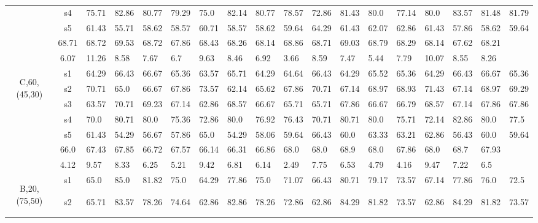 \begin{table}[h]
{\begin{tabular}{cc|llll|llll|llll|llll}
 & s4 & 75.71 & 82.86 & 80.77 & 79.29 & 75.0 & 82.14 & 80.77 & 78.57 & 72.86 & 81.43 & 80.0 & 77.14 & 80.0 & 83.57 & 81.48 & 81.79 \\
 & s5 & 61.43 & 55.71 & 58.62 & 58.57 & 60.71 & 58.57 & 58.62 & 59.64 & 64.29 & 61.43 & 62.07 & 62.86 & 61.43 & 57.86 & 58.62 & 59.64 \\
\rowcolor{lightgray!50}\multicolumn{2}{r|}{avg} & 68.71 & 68.72 & 69.53 & 68.72 & 67.86 & 68.43 & 68.26 & 68.14 & 68.86 & 68.71 & 69.03 & 68.79 & 68.29 & 68.14 & 67.62 & 68.21 \\
\rowcolor{lightgray!50}\multicolumn{2}{r|}{std} & 6.07 & 11.26 & 8.58 & 7.67 & 6.7 & 9.63 & 8.46 & 6.92 & 3.66 & 8.59 & 7.47 & 5.44 & 7.79 & 10.07 & 8.55 & 8.26 \\
\multirow{6}{*}{\begin{sideways}C,60,(45,30)\end{sideways}} & s1 & 64.29 & 66.43 & 66.67 & 65.36 & 63.57 & 65.71 & 64.29 & 64.64 & 66.43 & 64.29 & 65.52 & 65.36 & 64.29 & 66.43 & 66.67 & 65.36 \\
 & s2 & 70.71 & 65.0 & 66.67 & 67.86 & 73.57 & 62.14 & 65.62 & 67.86 & 70.71 & 67.14 & 68.97 & 68.93 & 71.43 & 67.14 & 68.97 & 69.29 \\
 & s3 & 63.57 & 70.71 & 69.23 & 67.14 & 62.86 & 68.57 & 66.67 & 65.71 & 65.71 & 67.86 & 66.67 & 66.79 & 68.57 & 67.14 & 67.86 & 67.86 \\
 & s4 & 70.0 & 80.71 & 80.0 & 75.36 & 72.86 & 80.0 & 76.92 & 76.43 & 70.71 & 80.71 & 80.0 & 75.71 & 72.14 & 82.86 & 80.0 & 77.5 \\
 & s5 & 61.43 & 54.29 & 56.67 & 57.86 & 65.0 & 54.29 & 58.06 & 59.64 & 66.43 & 60.0 & 63.33 & 63.21 & 62.86 & 56.43 & 60.0 & 59.64 \\
\rowcolor{lightgray!50}\multicolumn{2}{r|}{avg} & 66.0 & 67.43 & 67.85 & 66.72 & 67.57 & 66.14 & 66.31 & 66.86 & 68.0 & 68.0 & 68.9 & 68.0 & 67.86 & 68.0 & 68.7 & 67.93 \\
\rowcolor{lightgray!50}\multicolumn{2}{r|}{std} & 4.12 & 9.57 & 8.33 & 6.25 & 5.21 & 9.42 & 6.81 & 6.14 & 2.49 & 7.75 & 6.53 & 4.79 & 4.16 & 9.47 & 7.22 & 6.5 \\
\multirow{6}{*}{\begin{sideways}B,20,(75,50)\end{sideways}} & s1 & 65.0 & 85.0 & 81.82 & 75.0 & 64.29 & 77.86 & 75.0 & 71.07 & 66.43 & 80.71 & 79.17 & 73.57 & 67.14 & 77.86 & 76.0 & 72.5 \\
 & s2 & 65.71 & 83.57 & 78.26 & 74.64 & 62.86 & 82.86 & 78.26 & 72.86 & 62.86 & 84.29 & 81.82 & 73.57 & 62.86 & 84.29 & 81.82 & 73.57 \\

\end{tabular}}
\end{table}
